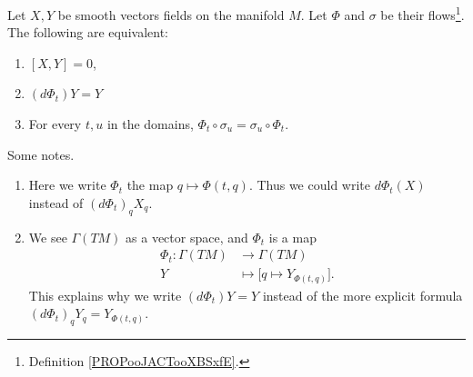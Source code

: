 \begin{proposition}       \label{PROPooDPXIooTvXOIP}
	Let \( X,Y\) be smooth vectors fields on the manifold \( M\). Let \( \Phi\) and \( \sigma\) be their flows\footnote{Definition \ref{PROPooJACTooXBSxfE}.}. The following are equivalent:
	\begin{enumerate}
		\item		\label{ITEMooMOCPooTlYzil}
		      \( [X,Y]=0\),
		\item		\label{ITEMooOSZCooLkFAaV}
		      \( (d\Phi_t)Y=Y\)
		\item		\label{ITEMooZIRJooFNogYn}
		      For every \( t,u\) in the domains, \( \Phi_t\circ\sigma_u=\sigma_u\circ\Phi_t\).
	\end{enumerate}
	Some notes.
	\begin{enumerate}
		\item
		      Here we write \( \Phi_t\) the map \( q\mapsto \Phi(t,q)\). Thus we could write \( d\Phi_t(X)\) instead of \( (d\Phi_t)_qX_q\).
		\item
		      We see \( \Gamma(TM)\) as a vector space, and \( \Phi_t\) is a map
		      \begin{equation}
			      \begin{aligned}
				      \Phi_t\colon \Gamma(TM) & \to \Gamma(TM)                              \\
				      Y                       & \mapsto \big[ q\mapsto Y_{\Phi(t,q)} \big].
			      \end{aligned}
		      \end{equation}
		      This explains why we write \( (d\Phi_t)Y=Y\) instead of the more explicit formula \( (d\Phi_t)_qY_q=Y_{\Phi(t,q)}\).
	\end{enumerate}
\end{proposition}

